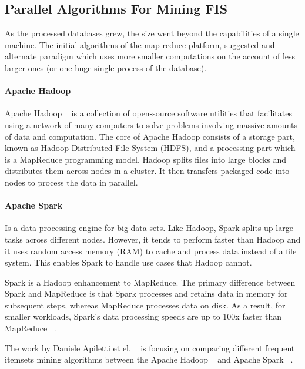 \subsection{Parallel Algorithms For Mining FIS}
As the processed databases grew, the size went beyond the capabilities of a single machine. The initial algorithms of the map-reduce platform, suggested and alternate paradigm which uses more smaller computations on the account of less larger ones (or one huge single process of the database).

\paragraph{Apache Hadoop}
Apache Hadoop ~\cite{hadoop} is a collection of open-source software utilities that facilitates using a network of many computers to solve problems involving massive amounts of data and computation. The core of Apache Hadoop consists of a storage part, known as Hadoop Distributed File System (HDFS), and a processing part which is a MapReduce programming model. Hadoop splits files into large blocks and distributes them across nodes in a cluster. It then transfers packaged code into nodes to process the data in parallel. 
\paragraph{Apache Spark}
Is a data processing engine for big data sets. Like Hadoop, Spark splits up large tasks across different nodes. However, it tends to perform faster than Hadoop and it uses random access memory (RAM) to cache and process data instead of a file system. This enables Spark to handle use cases that Hadoop cannot.

Spark is a Hadoop enhancement to MapReduce. The primary difference between Spark and MapReduce is that Spark processes and retains data in memory for subsequent steps, whereas MapReduce processes data on disk. As a result, for smaller workloads, Spark’s data processing speeds are up to 100x faster than MapReduce ~\citep{SparkPerformance}.

\label{sec:sparkvhadoop}
The work by Daniele Apiletti et el. ~\cite{APILETTI201767} is focusing on comparing different frequent itemsets mining algorithms between the Apache Hadoop ~\cite{hadoop} and Apache Spark ~\cite{spark}.

